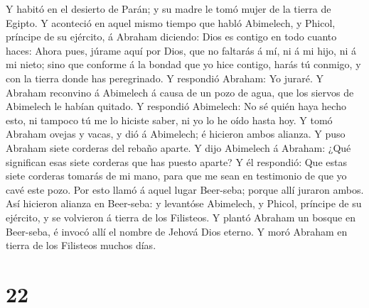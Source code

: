  Y habitó en el desierto de Parán; y su madre le tomó mujer
de la tierra de Egipto.  Y aconteció en aquel mismo tiempo
que habló Abimelech, y Phicol, príncipe de su ejército, á Abraham
diciendo: Dios es contigo en todo cuanto haces:  Ahora
pues, júrame aquí por Dios, que no faltarás á mí, ni á mi hijo, ni á mi
nieto; sino que conforme á la bondad que yo hice contigo, harás tú
conmigo, y con la tierra donde has peregrinado.  Y
respondió Abraham: Yo juraré.  Y Abraham reconvino á
Abimelech á causa de un pozo de agua, que los siervos de Abimelech le
habían quitado.  Y respondió Abimelech: No sé quién haya
hecho esto, ni tampoco tú me lo hiciste saber, ni yo lo he oído hasta
hoy.  Y tomó Abraham ovejas y vacas, y dió á Abimelech; é
hicieron ambos alianza.  Y puso Abraham siete corderas del
rebaño aparte.  Y dijo Abimelech á Abraham: ¿Qué significan
esas siete corderas que has puesto aparte?  Y él respondió:
Que estas siete corderas tomarás de mi mano, para que me sean en
testimonio de que yo cavé este pozo.  Por esto llamó á
aquel lugar Beer-seba; porque allí juraron ambos.  Así
hicieron alianza en Beer-seba: y levantóse Abimelech, y Phicol, príncipe
de su ejército, y se volvieron á tierra de los Filisteos. 
Y plantó Abraham un bosque en Beer-seba, é invocó allí el nombre de
Jehová Dios eterno.  Y moró Abraham en tierra de los
Filisteos muchos días.

\hypertarget{section-21}{%
\section{22}\label{section-21}}

